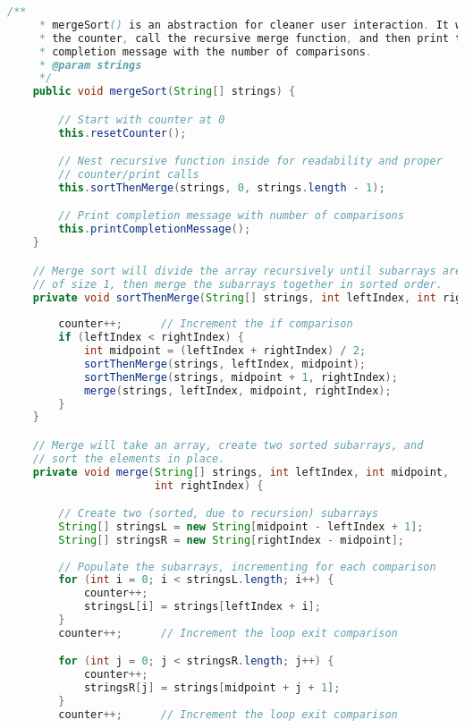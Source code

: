 \documentclass[letterpaper, 10pt]{article}
\begin{document}
\vspace{2.0em}

\begin{lstlisting}[language=Java, firstnumber=80]
    /**
     * mergeSort() is an abstraction for cleaner user interaction. It will reset
     * the counter, call the recursive merge function, and then print the
     * completion message with the number of comparisons.
     * @param strings
     */
    public void mergeSort(String[] strings) {

        // Start with counter at 0
        this.resetCounter();

        // Nest recursive function inside for readability and proper
        // counter/print calls
        this.sortThenMerge(strings, 0, strings.length - 1);

        // Print completion message with number of comparisons
        this.printCompletionMessage();
    }

    // Merge sort will divide the array recursively until subarrays are
    // of size 1, then merge the subarrays together in sorted order.
    private void sortThenMerge(String[] strings, int leftIndex, int rightIndex) {
        
        counter++;      // Increment the if comparison
        if (leftIndex < rightIndex) {
            int midpoint = (leftIndex + rightIndex) / 2;
            sortThenMerge(strings, leftIndex, midpoint);
            sortThenMerge(strings, midpoint + 1, rightIndex);
            merge(strings, leftIndex, midpoint, rightIndex);
        }
    }

    // Merge will take an array, create two sorted subarrays, and
    // sort the elements in place.
    private void merge(String[] strings, int leftIndex, int midpoint,
                       int rightIndex) {

        // Create two (sorted, due to recursion) subarrays
        String[] stringsL = new String[midpoint - leftIndex + 1];
        String[] stringsR = new String[rightIndex - midpoint];
        
        // Populate the subarrays, incrementing for each comparison
        for (int i = 0; i < stringsL.length; i++) {
            counter++;
            stringsL[i] = strings[leftIndex + i];
        }
        counter++;      // Increment the loop exit comparison

        for (int j = 0; j < stringsR.length; j++) {
            counter++;
            stringsR[j] = strings[midpoint + j + 1];
        }
        counter++;      // Increment the loop exit comparison


\end{lstlisting}
\end{document}
